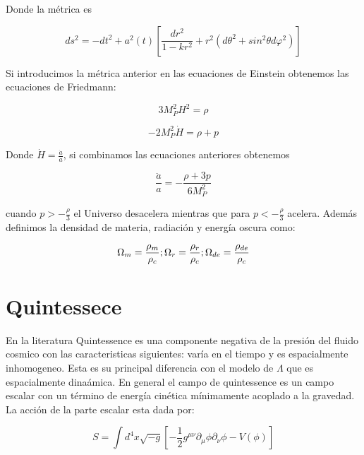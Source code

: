 \documentclass{article}
\begin{document}
Donde la m\'etrica es

\begin{equation}
ds^2= -dt^2 + a^{2}(t) [\frac{dr^2}{1-k r^2} +r^2(d \theta^{2}+sin^{2} \theta d\varphi^{2})] 
\end{equation}

Si introducimos la m\'etrica anterior en las ecuaciones de Einstein obtenemos las ecuaciones de Friedmann:

\begin{equation}
3M_{P} ^{2} H^{2}=\rho
\end{equation}

\begin{equation}
-2M_{P} ^{2} \dot{H}=\rho + p
\end{equation}

Donde $\dot{H}=\frac{\dot{a}}{a}$, si combinamos las ecuaciones anteriores obtenemos 

\begin{equation}
\frac{\ddot{a}}{a} = -\frac{\rho + 3p}{6 M_{P} ^{2}}
\end{equation}

cuando $p> - \frac{\rho}{3}$ el Universo desacelera mientras que para $p< -\frac{\rho}{3}$ acelera.
Adem\'as definimos la densidad de materia, radiaci\'on y energ\'ia oscura como:

\begin{equation}
\Omega_{m} = \frac{\rho_{m}}{\rho_{c}};\\ \Omega_{r}=\frac{\rho_{r}}{\rho_{c}};\\ \Omega_{de}=\frac{\rho_{de}}{\rho_{c}}
\end{equation}

 
\section*{Quintessece} 
En la literatura Quintessence es una componente negativa de la presi\'on del fluido cosmico con las caracteristicas siguientes:
var\'ia en el tiempo y es espacialmente inhomogeneo. Esta es su principal diferencia con el modelo de $\Lambda$ que es espacialmente dina\'amica.
En general el campo de quintessence es un campo escalar con un t\'ermino de energ\'ia cin\'etica m\'inimamente acoplado a la gravedad. La acci\'on de la parte escalar esta dada por:

\begin{equation}
S=\int d^{4} x \sqrt{-g} [-\frac{1}{2} g^{\mu \nu} \partial_{\mu}\phi \partial_{\nu}\phi - V(\phi)]
\end{equation}
\end{document}
